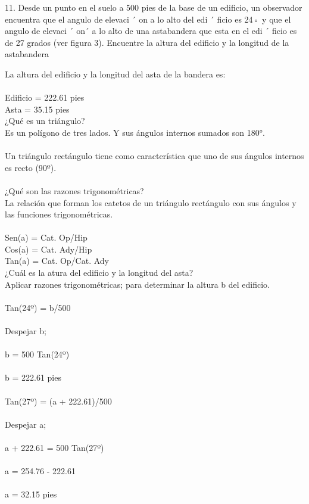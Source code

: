 \documentclass[11pt]{article}
\begin{document}
11. Desde un punto en el suelo a 500 pies de la base de un edificio, un observador encuentra que el angulo de elevaci ´ on a lo alto del edi ´ ficio es 24◦ y que el angulo de elevaci ´ on´
a lo alto de una astabandera que esta en el edi ´ ficio es de 27 grados (ver figura 3). Encuentre la altura del edificio y la longitud de la astabandera

La altura del edificio y la longitud del asta de la bandera es:\\
\\
Edificio = 222.61 pies\\
Asta = 35.15 pies\\
¿Qué es un triángulo?\\
Es un polígono de tres lados. Y sus ángulos internos sumados son 180°.\\
\\
Un triángulo rectángulo tiene como característica que uno de sus ángulos internos es recto (90º).\\
\\
¿Qué son las razones trigonométricas?\\
La relación que forman los catetos de un triángulo rectángulo con sus ángulos y las funciones trigonométricas.\\
\\
Sen(a) = Cat. Op/Hip\\
Cos(a) = Cat. Ady/Hip\\
Tan(a) = Cat. Op/Cat. Ady\\
¿Cuál es la atura del edificio y la longitud del asta?\\
Aplicar razones trigonométricas; para determinar la altura b del edificio.\\
\\
Tan(24º) = b/500\\
\\
Despejar b;\\
\\
b = 500 Tan(24º)\\
\\
b = 222.61 pies\\
\\
Tan(27º) = (a + 222.61)/500\\
\\
Despejar a;\\
\\
a + 222.61 = 500 Tan(27º)\\
\\
a = 254.76 - 222.61\\
\\
a = 32.15 pies\\
\\
\end{document}
